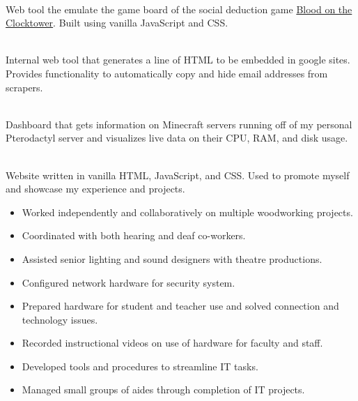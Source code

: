 \documentclass[10pt,a4paper,ragged2e,withhyper]{altacv}
\begin{document}

 \\\smallskip
Web tool the emulate the game board of the social deduction game \href{https://bloodontheclocktower.com/}{Blood on the Clocktower}. Built using vanilla JavaScript and CSS.

\divider

\\\smallskip
Internal web tool that generates a line of HTML to be embedded in
google sites. Provides functionality to automatically copy and hide email
addresses from scrapers.

\divider

 \\\smallskip
Dashboard that gets information on Minecraft servers running off
of my personal Pterodactyl  server and visualizes live data on their
CPU, RAM, and disk usage.

\divider

 \\\smallskip
Website written in vanilla HTML, JavaScript, and CSS.
Used to promote myself and showcase my experience
and projects.



\smallskip
{}

\begin{itemize}
\item Worked independently and collaboratively on multiple woodworking projects.
\item Coordinated with both hearing and deaf co-workers.
\item Assisted senior lighting and sound designers with theatre productions.
\end{itemize}

\divider

\begin{itemize}
\item Configured network hardware for security system.
\item Prepared hardware for student and teacher use and solved connection and technology issues.
\item Recorded instructional videos on use of hardware for faculty and staff.
\item Developed tools and procedures to streamline IT tasks.
\item Managed small groups of aides through completion of IT projects.
\end{itemize}
\end{document}
